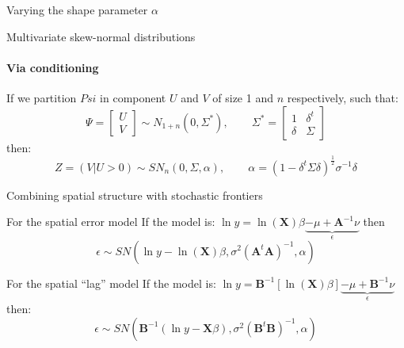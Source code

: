 \documentclass[presentation]{beamer}
\begin{document}
\begin{frame}{Varying the shape parameter $\alpha$}
\begin{figure}[h]
\center
{}
\label{fig:sn5}
\end{figure}
\end{frame}

\begin{frame}{Multivariate skew-normal distributions}
\framesubtitle{Via conditioning}
If we partition $Psi$ in component $U$ and $V$ of size 1 and $n$ respectively, such that:
\begin{equation*}
	\Psi = \begin{bmatrix}
	U \\ V
	\end{bmatrix} \sim N_{1+n}(0,\Sigma^*), \hspace{25pt} \Sigma^* = \begin{bmatrix}
	1 & \delta^t \\
	\delta & \Sigma
	\end{bmatrix}
\end{equation*}
then:
\begin{equation*}
	Z = (V|U>0 )\sim SN_n(0,\Sigma, \alpha), \hspace{25pt} \alpha = (1-\delta^t \Sigma \delta)^\frac{1}{2} \sigma^{-1}\delta
\end{equation*}
\end{frame}

\begin{frame}{Combining spatial structure with stochastic frontiers}

\begin{block}{For the spatial error model}
	If the model is: $\ln y = \ln(\mathbf{X}) \beta \underbrace{- \mu +  \mathbf{A}^{-1}\nu}_\epsilon$ then
	\begin{equation*}
	\epsilon  \sim SN(\ln y - \ln(\mathbf{X}) \beta, \sigma^2 (\mathbf{A}^t \mathbf{A})^{-1}, \alpha)
	\end{equation*}
\end{block}

\begin{block}{For the spatial ``lag'' model}
	If the model is: $\ln y =  \mathbf{B}^{-1}\left[\ln(\mathbf{X}) \beta\right] \underbrace{ - \mu+ \mathbf{B}^{-1}\nu}_{\epsilon}$ then:
	\begin{equation*}
		\epsilon \sim  SN(\mathbf{B}^{-1}(\ln y - \mathbf{X}\beta), \sigma^2 (\mathbf{B}^t \mathbf{B})^{-1}, \alpha)
	\end{equation*}
\end{block}


\end{frame}
\end{document}

